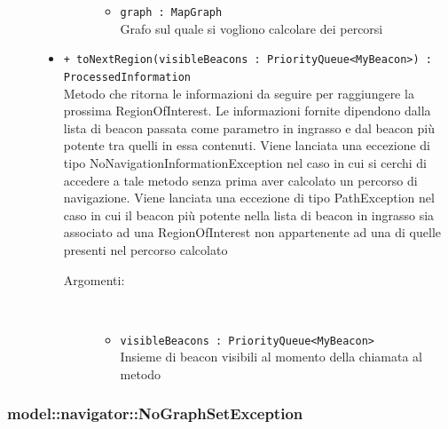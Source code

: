 \documentclass[../DefinizioneDiProdotto.tex]{subfiles}
\begin{document}
\begin{description}
\begin{itemize}
\begin{description}
\begin{itemize}
\item \texttt{graph : MapGraph}\\
Grafo sul quale si vogliono calcolare dei percorsi\end{itemize}
\end{description}
\item \texttt{+ toNextRegion(visibleBeacons : PriorityQueue<MyBeacon>) : ProcessedInformation}\\
Metodo che ritorna le informazioni da seguire per raggiungere la prossima RegionOfInterest. Le informazioni fornite dipendono dalla lista di beacon passata come parametro in ingrasso e dal beacon più potente tra quelli in essa contenuti. Viene lanciata una eccezione di tipo NoNavigationInformationException nel caso in cui si cerchi di accedere a tale metodo senza prima aver calcolato un percorso di navigazione. Viene lanciata una eccezione di tipo PathException nel caso in cui il beacon più potente nella lista di beacon in ingrasso sia associato ad una RegionOfInterest non appartenente ad una di quelle presenti nel percorso calcolato
 \begin{description}
\item[Argomenti:] \
\begin{itemize}
\item \texttt{visibleBeacons : PriorityQueue<MyBeacon>}\\
Insieme di beacon visibili al momento della chiamata al metodo\end{itemize}
\end{description}
\end{itemize}
\end{description}

\subsubsection{model::navigator::NoGraphSetException}
\end{document}
